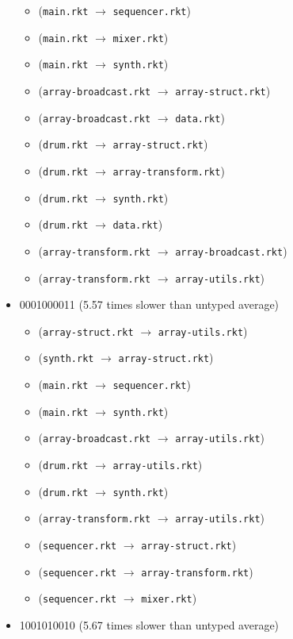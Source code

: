 \documentclass{article}
\newcommand{\mono}[1]{\texttt{#1}}
\begin{document}
\begin{itemize}
\begin{itemize}
  \item (\mono{main.rkt} $\rightarrow$ \mono{sequencer.rkt})
  \item (\mono{main.rkt} $\rightarrow$ \mono{mixer.rkt})
  \item (\mono{main.rkt} $\rightarrow$ \mono{synth.rkt})
  \item (\mono{array-broadcast.rkt} $\rightarrow$ \mono{array-struct.rkt})
  \item (\mono{array-broadcast.rkt} $\rightarrow$ \mono{data.rkt})
  \item (\mono{drum.rkt} $\rightarrow$ \mono{array-struct.rkt})
  \item (\mono{drum.rkt} $\rightarrow$ \mono{array-transform.rkt})
  \item (\mono{drum.rkt} $\rightarrow$ \mono{synth.rkt})
  \item (\mono{drum.rkt} $\rightarrow$ \mono{data.rkt})
  \item (\mono{array-transform.rkt} $\rightarrow$ \mono{array-broadcast.rkt})
  \item (\mono{array-transform.rkt} $\rightarrow$ \mono{array-utils.rkt})
  \end{itemize}
\item 0001000011 (5.57 times slower than untyped average)
  \begin{itemize}
  \item (\mono{array-struct.rkt} $\rightarrow$ \mono{array-utils.rkt})
  \item (\mono{synth.rkt} $\rightarrow$ \mono{array-struct.rkt})
  \item (\mono{main.rkt} $\rightarrow$ \mono{sequencer.rkt})
  \item (\mono{main.rkt} $\rightarrow$ \mono{synth.rkt})
  \item (\mono{array-broadcast.rkt} $\rightarrow$ \mono{array-utils.rkt})
  \item (\mono{drum.rkt} $\rightarrow$ \mono{array-utils.rkt})
  \item (\mono{drum.rkt} $\rightarrow$ \mono{synth.rkt})
  \item (\mono{array-transform.rkt} $\rightarrow$ \mono{array-utils.rkt})
  \item (\mono{sequencer.rkt} $\rightarrow$ \mono{array-struct.rkt})
  \item (\mono{sequencer.rkt} $\rightarrow$ \mono{array-transform.rkt})
  \item (\mono{sequencer.rkt} $\rightarrow$ \mono{mixer.rkt})
  \end{itemize}
\item 1001010010 (5.67 times slower than untyped average)

\end{itemize}
\end{document}
